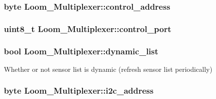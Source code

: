 \subsubsection[{\texorpdfstring{control\+\_\+address}{control_address}}]{\setlength{\rightskip}{0pt plus 5cm}byte Loom\+\_\+\+Multiplexer\+::control\+\_\+address\hspace{0.3cm}{\ttfamily [protected]}}\hypertarget{class_loom___multiplexer_a56aa8b81fecbab9d25c7c9fb0e607908}{}\label{class_loom___multiplexer_a56aa8b81fecbab9d25c7c9fb0e607908}
\subsubsection[{\texorpdfstring{control\+\_\+port}{control_port}}]{\setlength{\rightskip}{0pt plus 5cm}uint8\+\_\+t Loom\+\_\+\+Multiplexer\+::control\+\_\+port\hspace{0.3cm}{\ttfamily [protected]}}\hypertarget{class_loom___multiplexer_a0b5eae9f338d70f873c04a5c46f6556c}{}\label{class_loom___multiplexer_a0b5eae9f338d70f873c04a5c46f6556c}
\subsubsection[{\texorpdfstring{dynamic\+\_\+list}{dynamic_list}}]{\setlength{\rightskip}{0pt plus 5cm}bool Loom\+\_\+\+Multiplexer\+::dynamic\+\_\+list\hspace{0.3cm}{\ttfamily [protected]}}\hypertarget{class_loom___multiplexer_a90202eb1f078d7448cf0b0763ddbcb3d}{}\label{class_loom___multiplexer_a90202eb1f078d7448cf0b0763ddbcb3d}


Whether or not sensor list is dynamic (refresh sensor list periodically) 

\subsubsection[{\texorpdfstring{i2c\+\_\+address}{i2c_address}}]{\setlength{\rightskip}{0pt plus 5cm}byte Loom\+\_\+\+Multiplexer\+::i2c\+\_\+address\hspace{0.3cm}{\ttfamily [protected]}}\hypertarget{class_loom___multiplexer_af382145cee4e802bbf431e799983423b}{}\label{class_loom___multiplexer_af382145cee4e802bbf431e799983423b}


